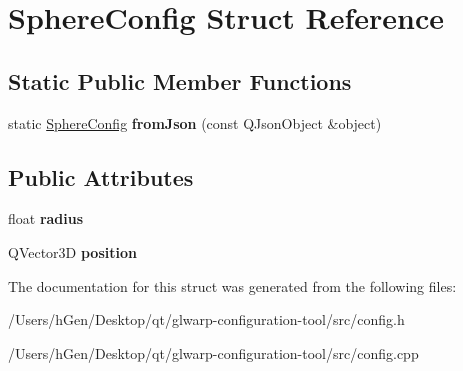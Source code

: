 \hypertarget{struct_sphere_config}{}\section{Sphere\+Config Struct Reference}
\label{struct_sphere_config}
\subsection*{Static Public Member Functions}
\begin{DoxyCompactItemize}
\item 
\mbox{\label{struct_sphere_config_ae2afef24c4833ae511819289b5ecba88}} 
static \mbox{\hyperlink{struct_sphere_config}{Sphere\+Config}} {\bfseries from\+Json} (const Q\+Json\+Object \&object)
\end{DoxyCompactItemize}
\subsection*{Public Attributes}
\begin{DoxyCompactItemize}
\item 
\mbox{\label{struct_sphere_config_a631eac0150bf26918c6abe19cb3a2a22}} 
float {\bfseries radius}
\item 
\mbox{\label{struct_sphere_config_a1babf4e3aba776830b65a4bd9885d45c}} 
Q\+Vector3D {\bfseries position}
\end{DoxyCompactItemize}


The documentation for this struct was generated from the following files\+:\begin{DoxyCompactItemize}
\item 
/\+Users/h\+Gen/\+Desktop/qt/glwarp-\/configuration-\/tool/src/config.\+h\item 
/\+Users/h\+Gen/\+Desktop/qt/glwarp-\/configuration-\/tool/src/config.\+cpp\end{DoxyCompactItemize}
